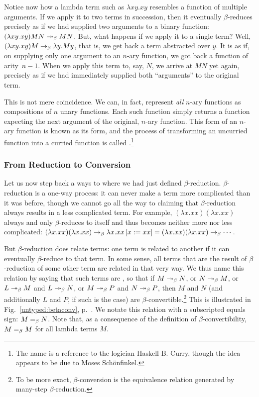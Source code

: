 Notice now how a lambda term such as $\lambda xy. xy$ resembles a function of multiple arguments. If we apply it to two terms in succession, then it eventually $\beta$-reduces precisely as if we had supplied two arguments to a binary function: $(\lambda xy. xy) M N \betared[*] M N$. But, what happens if we apply it to a single term? Well, $(\lambda xy. xy) M \betared \lambda y. My$, that is, we get back a term abstracted over $y$. It is as if, on supplying only one argument to an $n$-ary function, we got back a function of \mbox{arity $n - 1$.} When we apply this term to, say, $N$, we arrive at $M N$ yet again, precisely as if we had immediately supplied both ``arguments'' to the original term.

This is not mere coincidence. We can, in fact, represent \emph{all} $n$-ary functions as compositions of $n$ unary functions. Each such function simply returns a function expecting the next argument of the original, $n$-ary function. This form of an $n$-ary function is known as its  form, and the process of transforming an uncurried function into a curried function is called .\footnote{The name is a reference to the logician Haskell B. Curry, though the idea appears to be due to Moses Sch\"{o}nfinkel.}

\subsubsection{From Reduction to Conversion}\label{untyped:conversion}
Let us now step back a ways to where we had just defined $\beta$-reduction. $\beta$-reduction is a one-way process: it can never make a term more complicated than it was before, though we cannot go all the way to claiming that $\beta$-reduction always results in a less complicated term. For example, $(\lambda x.xx) (\lambda x.xx)$ always and only $\beta$-reduces to itself and thus becomes neither more nor less complicated: $(\lambda x.xx) (\lambda x.xx) \betared \replace{x}{xx}{\lambda x. xx} = (\lambda x.xx) (\lambda x.xx) \betared \dotsb$.

But $\beta$-reduction does relate terms: one term is related to another if it can eventually $\beta$-reduce to that term. In some sense, all terms that are the result of $\beta$-reduction of some other term are related in that very way. We thus name this relation by saying that such terms are , so that if $M \betared[*] N$, or $N \betared[*] M$, or $L \betared[*] M$ and $L \betared[*] N$, or $M \betared[*] P$ and $N \betared[*] P$, then $M$ and $N$ (and additionally $L$ and $P$, if such is the case) are $\beta$-convertible.\footnote{To be more exact, $\beta$-conversion is the equivalence relation generated by many-step $\beta$-reduction.} This is illustrated in Fig.~\ref{untyped:betaconv}, p.~\pageref{untyped:betaconv}. We notate this relation with a subscripted equals sign: $M =_{\beta} N$. Note that, as a consequence of the definition of $\beta$-convertibility, $M =_{\beta} M$ for all lambda terms $M$. 

